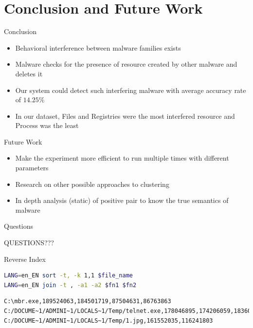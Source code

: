 \documentclass[]{beamer}
\begin{document}
\section{Conclusion and Future Work}
\begin{frame}{Conclusion}
  \begin{itemize}
    \item Behavioral interference between malware families exists
    \item Malware checks for the presence of resource created by other malware and deletes it
    \item Our system could detect such interfering malware with average accuracy rate of $14.25\%$
    \item In our dataset, Files and Registries were the most interfered resource and Process was the least
  \end{itemize}
\end{frame}
\begin{frame}{Future Work}
  \begin{itemize}
    \item Make the experiment more efficient to run multiple times with different parameters
    \item Research on other possible approaches to clustering
    \item In depth analysis (static) of positive pair to know the true semantics of malware
  \end{itemize}
\end{frame}
\begin{frame}[plain,c]{Questions}
  \begin{center}
    \Huge QUESTIONS???
  \end{center}
\end{frame}
\appendix
\begin{frame}{Reverse Index}
\begin{lstlisting}[numbers=none,language=bash,caption={Sort and join the reverse index}]
LANG=en_EN sort -t, -k 1,1 $file_name
LANG=en_EN join -t , -a1 -a2 $fn1 $fn2
\end{lstlisting}
\begin{lstlisting}[numbers=none,caption={Sample of reverse index created for File activity},label={lst:reverseindex}]
C:\mbr.exe,189524063,184501719,87504631,86763863
C:/DOCUME~1/ADMINI~1/LOCALS~1/Temp/telnet.exe,178046895,174206059,183601891,89650247
C:/DOCUME~1/ADMINI~1/LOCALS~1/Temp/1.jpg,161552035,116241803
\end{lstlisting}
\end{frame}
\end{document}
